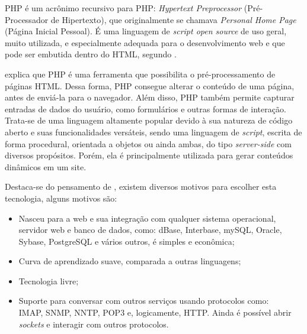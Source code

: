 
PHP é um acrônimo recursivo para PHP: \textit{Hypertext Preprocessor} (Pré-Processador de Hipertexto), que originalmente se chamava \textit{Personal Home Page} (Página Inicial Pessoal). É uma linguagem de \textit{script open source} de uso geral, muito utilizada, e especialmente adequada para o desenvolvimento web e que pode ser embutida dentro do HTML, segundo . %

 explica que PHP é uma ferramenta que possibilita o pré-processamento de páginas HTML. Dessa forma, PHP consegue alterar o conteúdo de uma página, antes de enviá-la para o navegador. Além disso, PHP também permite capturar entradas de dados do usuário, como formulários e outras formas de interação. Trata-se de uma linguagem altamente popular devido à sua natureza de código aberto e suas funcionalidades versáteis, sendo uma linguagem de \textit{script}, escrita de forma procedural, orientada a objetos ou ainda ambas, do tipo \textit{server-side} com diversos propósitos. Porém, ela é principalmente utilizada para gerar conteúdos dinâmicos em um site.

Destaca-se do pensamento de , existem diversos motivos para escolher esta tecnologia, alguns motivos são:

\begin{itemize}
    \item Nasceu para a web e sua integração com qualquer sistema operacional, servidor web e banco de dados, como: dBase, Interbase, mySQL, Oracle, Sybase, PostgreSQL e vários outros, é simples e econômica;
    \item Curva de aprendizado suave, comparada a outras linguagens;
    \item Tecnologia livre;
    \item Suporte para conversar com outros serviços usando protocolos como: \\ IMAP, SNMP, NNTP, POP3 e, logicamente, HTTP. Ainda é possível abrir \textit{sockets} e interagir com outros protocolos.
\end{itemize}

